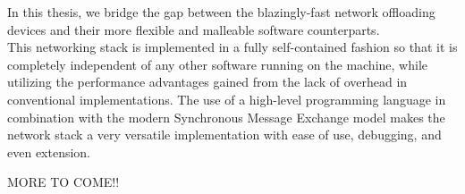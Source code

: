 In this thesis, we bridge the gap between the blazingly-fast network offloading
devices and their more flexible and malleable software counterparts.\\
This networking stack is implemented in a fully self-contained fashion so that
it is completely independent of any other software running on the machine, while
utilizing the performance advantages gained from the lack of overhead in
conventional implementations.
The use of a high-level programming language in combination with the modern
Synchronous Message Exchange model makes the network stack a very versatile
implementation with ease of use, debugging, and even extension.




MORE TO COME!!




